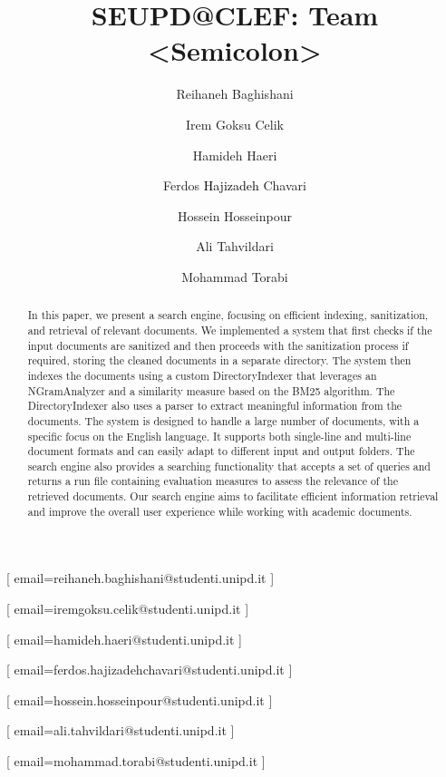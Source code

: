 \documentclass{ceurart}
\begin{document}


\title{SEUPD@CLEF: Team <Semicolon>}

\author[1]{Reihaneh Baghishani}[%
email=reihaneh.baghishani@studenti.unipd.it
]

\author[1]{Irem Goksu Celik}[%
email=iremgoksu.celik@studenti.unipd.it
]

\author[1]{Hamideh Haeri}[%
email=hamideh.haeri@studenti.unipd.it
]

\author[1]{Ferdos \textcolor{black}{Hajizadeh} Chavari}[%
email=ferdos.hajizadehchavari@studenti.unipd.it
]

\author[1]{Hossein Hosseinpour}[%
email=hossein.hosseinpour@studenti.unipd.it
]

\author[1]{Ali Tahvildari}[%
email=ali.tahvildari@studenti.unipd.it
]

\author[1]{Mohammad Torabi}[%
email=mohammad.torabi@studenti.unipd.it
]

\address[1]{University of Padua, Italy}


\begin{abstract}
  In this paper, we present a search engine, focusing on efficient indexing, sanitization, and retrieval of relevant documents. We implemented a system that first checks if the input documents are sanitized and then proceeds with the sanitization process if required, storing the cleaned documents in a separate directory. The system then indexes the documents using a custom DirectoryIndexer that leverages an NGramAnalyzer and a similarity measure based on the BM25 algorithm. The DirectoryIndexer also uses a parser to extract meaningful information from the documents. The system is designed to handle a large number of documents, with a specific focus on the English language. It supports both single-line and multi-line document formats and can easily adapt to different input and output folders. The search engine also provides a searching functionality that accepts a set of queries and returns a run file containing evaluation measures to assess the relevance of the retrieved documents. Our search engine aims to facilitate efficient information retrieval and improve the overall user experience while working with academic documents.
\end{abstract}
\end{document}
